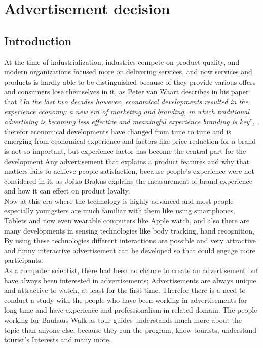 \chapter{Advertisement decision} %

\label{Chapter4} %

\section{Introduction}

At the time of industrialization, industries compete on product quality, and modern organizations focused more on delivering services, and now services and products is hardly able to be distinguished because of they provide various offers and consumers lose themselves in it, as Peter van Waart describes in his paper that ``\emph{In the last two decades however, economical developments resulted in the experience economy: a new era of marketing and branding, in which traditional advertising is becoming less effective and meaningful experience branding is key}'', \cite{Meaningful_ad}, therefor economical developments have changed from time to time and is emerging from economical experience and factors like price-reduction for a brand is not so important, but experience factor has become the central part for the development.Any advertisement that explains a product features and why that matters fails to achieve people satisfaction, because people’s experience were not considered in it, as Joško Brakus \cite{Brand_experience} explains the measurement of brand experience and how it can effect on product loyalty.\\

Now at this era where the technology is highly advanced and most people especially youngsters are much familiar with them like using smartphones, Tablets and now even wearable computers like Apple watch, and also there are many developments in sensing technologies like body tracking, hand recognition, By using these technologies different interactions are possible and very attractive and funny interactive advertisement can be developed so that could engage more participants.\\

As a computer scientist, there had been no chance to create an advertisement but have always been interested in advertisements; Advertisements are always unique and attractive to watch, at least for the first time. Therefor there is a need to conduct a study with the people who have been working in advertisements for long time and have experience and professionalism in related domain. The people working for Bauhaus-Walk as tour guides understands much more about the topic than anyone else, because they run the program, know tourists, understand tourist's Interests and many more.\\

